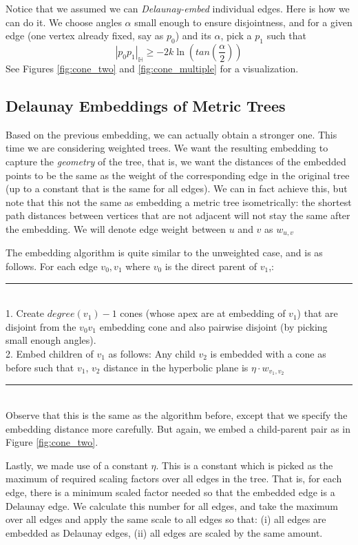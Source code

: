 Notice that we assumed we can \textit{Delaunay-embed} individual edges. Here is how we can do it. We choose angles $\alpha$ small enough to ensure disjointness, and for a given edge (one vertex already fixed, say as $p_0$) and its $\alpha$, pick a $p_1$ such that $$|p_0p_1|_{\mathbb{H}} \geq -2k\ln(tan(\frac{\alpha}{2}))$$ See Figures \ref{fig:cone_two} and \ref{fig:cone_multiple} for a visualization.

\subsection{Delaunay Embeddings of Metric Trees}
Based on the previous embedding, we can actually obtain a stronger one. This time we are considering weighted trees. We want the resulting embedding to capture the \textit{geometry} of the tree, that is, we want the distances of the embedded points to be the same as the weight of the corresponding edge in the original tree (up to a constant that is the same for all edges). We can in fact achieve this, but note that this not the same as embedding a metric tree isometrically: the shortest path distances between vertices that are not adjacent will not stay the same after the embedding. We will denote edge weight between $u$ and $v$ as $w_{u,v}$

The embedding algorithm is quite similar to the unweighted case, and is as follows. For each edge $v_0, v_1$ where $v_0$ is the direct parent of $v_1$,: \\
\rule{\linewidth}{0.5pt} \\
1. Create $degree(v_1) - 1$ cones (whose apex are at embedding of $v_1$) that are disjoint from the $v_0v_1$ embedding cone and also pairwise disjoint (by picking small enough angles). \\
2. Embed children of $v_1$ as follows: Any child $v_2$ is embedded with a cone as before such that $v_1$, $v_2$ distance in the hyperbolic plane is $\eta \cdot w_{v_1, v_2}$  \\
\rule{\linewidth}{0.5pt} \\

Observe that this is the same as the algorithm before, except that we specify the embedding distance more carefully. But again, we embed a child-parent pair as in Figure \ref{fig:cone_two}.

Lastly, we made use of a constant $\eta$. This is a constant which is picked as the maximum of required scaling factors over all edges in the tree. That is, for each edge, there is a minimum scaled factor needed so that the embedded edge is a Delaunay edge. We calculate this number for all edges, and take the maximum over all edges and apply the same scale to all edges so that: (i) all edges are embedded as Delaunay edges, (ii) all edges are scaled by the same amount.

